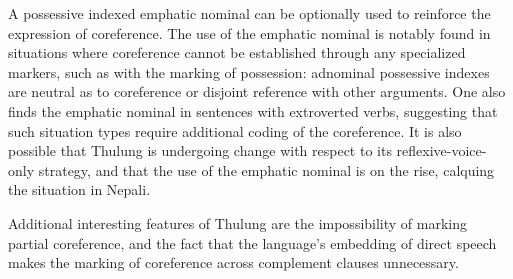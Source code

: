 \documentclass[output=paper]{langscibook}
\begin{document}
A possessive indexed emphatic nominal can be optionally used to reinforce the expression of coreference. The use of the emphatic nominal is notably found in situations where coreference cannot be established through any specialized markers, such as with the marking of possession: adnominal possessive indexes are neutral as to coreference or disjoint reference with other arguments. One also finds the emphatic nominal in sentences with extroverted verbs, suggesting that such situation types require additional coding of the coreference.  It is also possible that Thulung is undergoing change with respect to its reflexive-voice-only strategy, and that the use of the emphatic nominal is on the rise, calquing the situation in Nepali.

  Additional interesting features of Thulung are the impossibility of marking partial coreference, and the fact that the language's embedding of direct speech makes the marking of coreference across complement clauses unnecessary.
\end{document}
